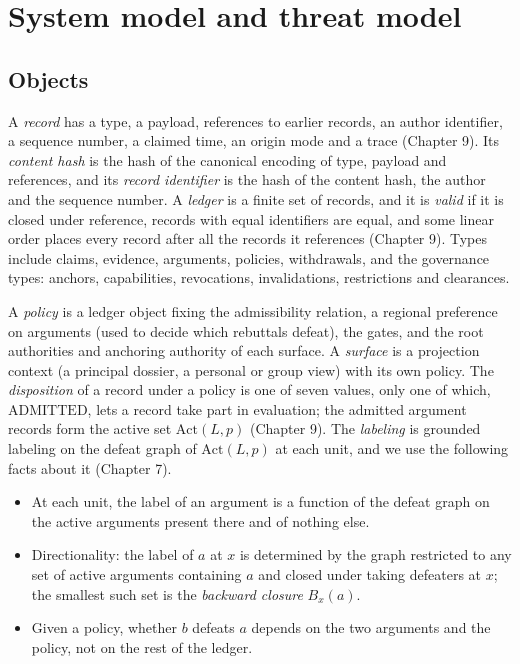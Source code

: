 \documentclass[11pt]{article}
\theoremstyle{plain}
\theoremstyle{definition}
\theoremstyle{remark}
\newcommand{\Act}{\mathrm{Act}}
\begin{document}
\section{System model and threat model}\label{sec:model}

\subsection{Objects}

A \emph{record} has a type, a payload, references to earlier records, an author identifier, a sequence number, a claimed time, an origin mode and a trace (Chapter 9). Its \emph{content hash} is the hash of the canonical encoding of type, payload and references, and its \emph{record identifier} is the hash of the content hash, the author and the sequence number. A \emph{ledger} is a finite set of records, and it is \emph{valid} if it is closed under reference, records with equal identifiers are equal, and some linear order places every record after all the records it references (Chapter 9). Types include claims, evidence, arguments, policies, withdrawals, and the governance types: anchors, capabilities, revocations, invalidations, restrictions and clearances.

A \emph{policy} is a ledger object fixing the admissibility relation, a regional preference on arguments (used to decide which rebuttals defeat), the gates, and the root authorities and anchoring authority of each surface. A \emph{surface} is a projection context (a principal dossier, a personal or group view) with its own policy. The \emph{disposition} of a record under a policy is one of seven values, only one of which, $\mathrm{ADMITTED}$, lets a record take part in evaluation; the admitted argument records form the active set $\Act(L,p)$ (Chapter 9). The \emph{labeling} is grounded labeling on the defeat graph of $\Act(L,p)$ at each unit, and we use the following facts about it (Chapter 7).

\begin{itemize}[nosep]
\item[(L1)] At each unit, the label of an argument is a function of the defeat graph on the active arguments present there and of nothing else.
\item[(L2)] Directionality: the label of $a$ at $x$ is determined by the graph restricted to any set of active arguments containing $a$ and closed under taking defeaters at $x$; the smallest such set is the \emph{backward closure} $B_x(a)$.
\item[(L3)] Given a policy, whether $b$ defeats $a$ depends on the two arguments and the policy, not on the rest of the ledger.
\end{itemize}
\end{document}
